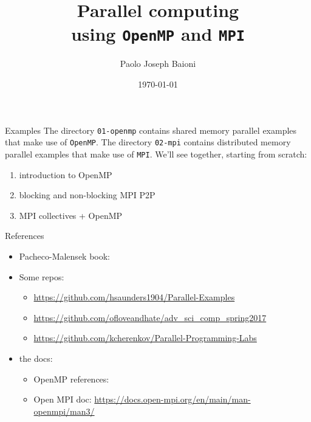 \documentclass[10pt]{beamer}
\begin{document}
    \title{Parallel computing\protect\\ using \texttt{OpenMP} and \texttt{MPI}}
    \author{Paolo Joseph Baioni}
    \date{\today}

\begin{frame}
    \maketitle
\end{frame}

\begin{frame}{Examples}
The directory \texttt{01-openmp} contains shared memory parallel examples that make use of \texttt{OpenMP}.
\vfill
The directory \texttt{02-mpi} contains distributed memory parallel examples that make use of \texttt{MPI}.
\vfill
We'll see together, starting from scratch:
\begin{enumerate}
	\item introduction to OpenMP
	\item blocking and non-blocking MPI P2P
	\item MPI collectives + OpenMP
\end{enumerate}
\end{frame}

\begin{frame}{References}

  \begin{itemize}
    \item Pacheco-Malensek book: \href{https://doi.org/10.1016/C2015-0-01650-1}{\color{blue}{https://doi.org/10.1016/C2015-0-01650-1}}
    \item Some repos:
    \begin{itemize}
      \item \url{https://github.com/hsaunders1904/Parallel-Examples}
      \item \url{https://github.com/ofloveandhate/adv_sci_comp_spring2017}
      \item \url{https://github.com/kcherenkov/Parallel-Programming-Labs}
    \end{itemize}
    \item the docs:
    \begin{itemize}
      \item OpenMP references: \href{https://www.openmp.org/resources/refguides/}{\color{blue}{https://www.openmp.org/resources/refguides/}}
      \item Open MPI doc: \href{https://docs.open-mpi.org/en/main/man-openmpi/man3/}{\color{blue}https://docs.open-mpi.org/en/main/man-openmpi/man3/}
    \end{itemize}
  \end{itemize}

\end{frame}
\end{document}
